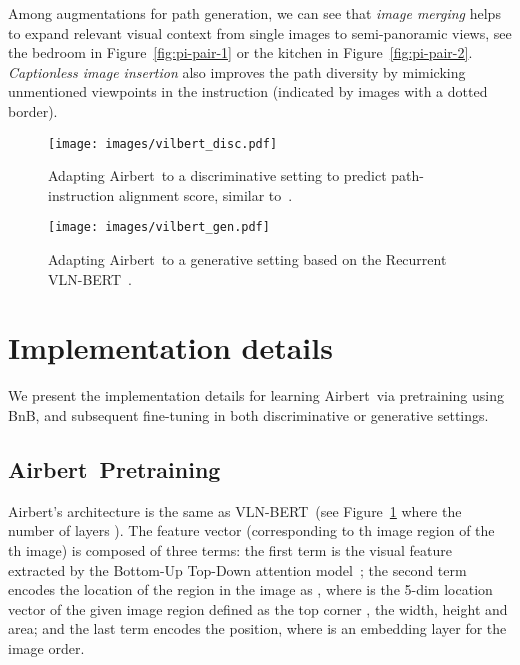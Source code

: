 \RequirePackage[dvipsnames,table]{xcolor} \documentclass[10pt,twocolumn,letterpaper]{article}
\newcommand{\vlnbert}{VLN-BERT}
\newcommand{\airbert}{Airbert}
\newcommand{\airbnb}{BnB}
\begin{document}
Among augmentations for path generation, we can see that \emph{image merging} helps to expand relevant visual context from single images to semi-panoramic views, see the bedroom in Figure~\ref{fig:pi-pair-1} or the kitchen in Figure~\ref{fig:pi-pair-2}.
\emph{Captionless image insertion} also improves the path diversity by mimicking unmentioned viewpoints in the instruction (indicated by images with a dotted border).

\begin{figure*}[t]
     \centering
     \begin{subfigure}{0.9\textwidth}
         \centering
         \texttt{[image: images/vilbert\_disc.pdf]}
         \caption{Adapting \airbert~to a discriminative setting to predict path-instruction alignment score, similar to~\cite{majumdar2020vlnbert}.}
         \label{fig:vilbert_disc_model}
     \end{subfigure}
     \hfill
     \begin{subfigure}{0.88\textwidth}
         \centering
         \texttt{[image: images/vilbert\_gen.pdf]}
         \caption{Adapting \airbert~to a generative setting based on the Recurrent VLN-BERT~\cite{hong2021recurrentvln}.}
         \label{fig:vilbert_gen_model}
     \end{subfigure}
    \caption{The adapted \airbert~model in both discriminative and generative settings for downstream VLN tasks.}
    \label{fig:models}
\end{figure*}


\section{Implementation details}
\label{sec:supp-details}

We present the implementation details for learning \airbert~via pretraining using \airbnb, and subsequent fine-tuning in both discriminative or generative settings.

\subsection{\airbert~Pretraining}
\airbert's architecture is the same as \vlnbert~(see Figure~\ref{fig:vilbert_disc_model} where the number of layers ).
The feature vector   (corresponding to th image region of the th image) is composed of three terms: the first term is the visual feature extracted by the Bottom-Up Top-Down attention model~\cite{anderson2017butd};
the second term encodes the location of the region in the image as , where  is the 5-dim location vector of the given image region defined as the top corner , the width, height and area;
and the last term  encodes the position, where  is an embedding layer for the image order.
\end{document}
